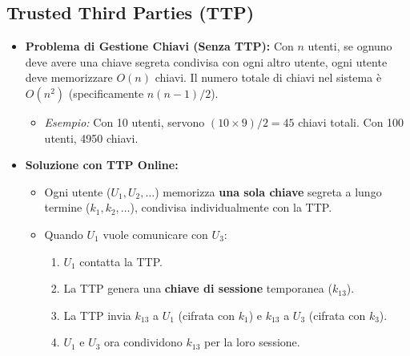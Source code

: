 \documentclass{article}
\begin{document}
\subsection{Trusted Third Parties (TTP)}
\begin{itemize}
    \item \textbf{Problema di Gestione Chiavi (Senza TTP):} Con $n$ utenti, se ognuno deve avere una chiave segreta condivisa con ogni altro utente, ogni utente deve memorizzare $O(n)$ chiavi. Il numero totale di chiavi nel sistema è $O(n^2)$ (specificamente $n(n-1)/2$).
        \begin{itemize}
            \item \textit{Esempio:} Con 10 utenti, servono $(10 \times 9)/2 = 45$ chiavi totali. Con 100 utenti, 4950 chiavi.
        \end{itemize}
    \item \textbf{Soluzione con TTP Online:}
        \begin{itemize}
            \item Ogni utente ($U_1, U_2, \dots$) memorizza \textbf{una sola chiave} segreta a lungo termine ($k_1, k_2, \dots$), condivisa individualmente con la TTP.
            \item Quando $U_1$ vuole comunicare con $U_3$:
                \begin{enumerate}
                    \item $U_1$ contatta la TTP.
                    \item La TTP genera una \textbf{chiave di sessione} temporanea ($k_{13}$).
                    \item La TTP invia $k_{13}$ a $U_1$ (cifrata con $k_1$) e $k_{13}$ a $U_3$ (cifrata con $k_3$).
                    \item $U_1$ e $U_3$ ora condividono $k_{13}$ per la loro sessione.
                \end{enumerate}
        \end{itemize}
        \begin{figure}[H]
            \centering
\end{figure}
\end{itemize}
\end{document}
